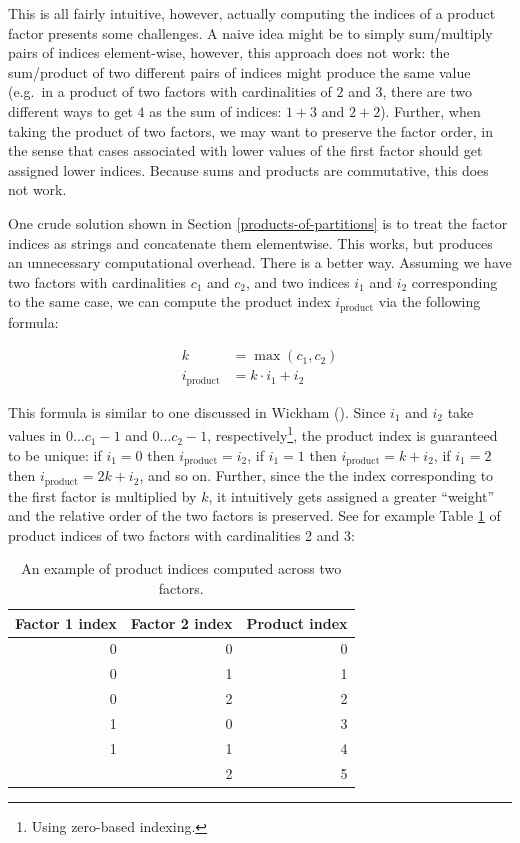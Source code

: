 \documentclass[
  openany]{book}
\theoremstyle{definition}
\theoremstyle{definition}
\theoremstyle{definition}
\theoremstyle{definition}
\theoremstyle{remark}
\begin{document}
This is all fairly intuitive, however, actually computing the indices of a product factor presents some challenges. A naive idea might be to simply sum/multiply pairs of indices element-wise, however, this approach does not work: the sum/product of two different pairs of indices might produce the same value (e.g.~in a product of two factors with cardinalities of \(2\) and \(3\), there are two different ways to get \(4\) as the sum of indices: \(1 + 3\) and \(2 + 2\)). Further, when taking the product of two factors, we may want to preserve the factor order, in the sense that cases associated with lower values of the first factor should get assigned lower indices. Because sums and products are commutative, this does not work.

One crude solution shown in Section \ref{products-of-partitions} is to treat the factor indices as strings and concatenate them elementwise. This works, but produces an unnecessary computational overhead. There is a better way. Assuming we have two factors with cardinalities \(c_1\) and \(c_2\), and two indices \(i_1\) and \(i_2\) corresponding to the same case, we can compute the product index \(i_{\text{product}}\) via the following formula:

\begin{align}
k &= \max(c_1, c_2) \\
i_{\text{product}} &= k \cdot i_{\text{1}} + i_{\text{2}}
\label{eq:product-indices}
\end{align}

This formula is similar to one discussed in Wickham (). Since \(i_1\) and \(i_2\) take values in \(0 \ldots c_1 - 1\) and \(0 \ldots c_2 - 1\), respectively\footnote{Using zero-based indexing.}, the product index is guaranteed to be unique: if \(i_1 = 0\) then \(i_{\text{product}} = i_2\), if \(i_1 = 1\) then \(i_{\text{product}} = k + i_2\), if \(i_1 = 2\) then \(i_{\text{product}} = 2k + i_2\), and so on. Further, since the the index corresponding to the first factor is multiplied by \(k\), it intuitively gets assigned a greater ``weight'' and the relative order of the two factors is preserved. See for example Table \ref{tab:product-indices} of product indices of two factors with cardinalities 2 and 3:

\begin{table}

\caption{\label{tab:product-indices}An example of product indices computed across two factors.}
\centering
\begin{tabular}[t]{rrr}
\toprule
Factor 1 index & Factor 2 index & Product index\\
\midrule
0 & 0 & 0\\
0 & 1 & 1\\
0 & 2 & 2\\
1 & 0 & 3\\
1 & 1 & 4\\
\addlinespace
1 & 2 & 5\\
\bottomrule
\end{tabular}
\end{table}
\end{document}
